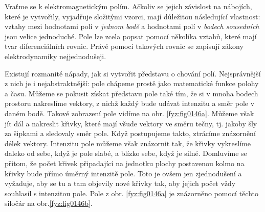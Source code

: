     Vraťme se k elektromagnetickým polím. Ačkoliv se jejich závislost na nábojích, které je
    vytvořily, vyjadřuje složitými vzorci, mají důležitou následující vlastnost: vztahy mezi
    hodnotami polí v \emph{jednom bodě} a hodnotami polí v \emph{bodech sousedních} jsou velice
    jednoduché. Pole lze zcela popsat pomocí několika vztahů, které mají tvar diferenciálních
    rovnic. Právě pomocí takových rovnic se zapisují zákony elektrodynamiky nejjednodušeji.
  
    Existují rozmanité nápady, jak si vytvořit představu o chování polí. Nejsprávnější z nich je i
    nejabstraktnější: pole chápeme prostě jako matematické funkce polohy a času. Můžeme se pokusit
    získat představu pole také tím, že si v mnoha bodech prostoru nakreslíme vektory, z nichž každý
    bude udávat intenzitu a směr pole v daném bodě. Takové zobrazení pole vidíme na obr.
    \ref{fyz:fig0146a}. Můžeme však jít dál a nakreslit křivky, které mají všude vektory ve směru
    tečny, tj. jakoby šly za šipkami a sledovaly směr pole. Když postupujeme takto, ztrácíme
    znázornění délek vektory. Intenzitu pole můžeme však znázornit tak, že křivky vykreslíme daleko
    od sebe, když je pole slabé, a blízko sebe, když je silné. Domluvíme se přitom, že počet křivek
    připadající na jednotku plochy postavenou kolmo na křivky bude přímo úměrný intenzitě pole. Toto
    je ovšem jen zjednodušení a vyžaduje, aby se tu a tam objevily nové křivky tak, aby jejich počet
    vždy souhlasil s intenzitou pole. Pole z obr. \ref{fyz:fig0146a} je znázorněno pomocí těchto
    siločár na obr.\ref{fyz:fig0146b}.
   
